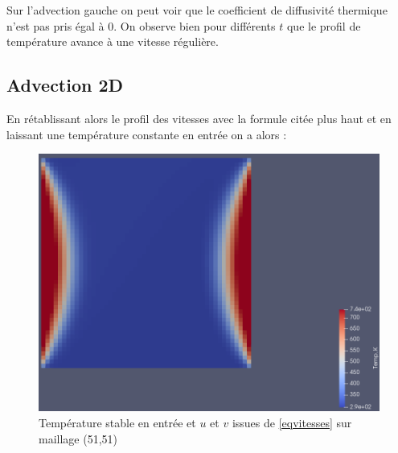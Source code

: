 \documentclass[a4paper,oneside]{article}
\begin{document}
Sur l'advection gauche on peut voir que le coefficient de diffusivité thermique n'est pas pris égal à 0.
On observe bien pour différents $t$ que le profil de température avance à une vitesse régulière.


\clearpage


\subsection{Advection 2D}
En rétablissant alors le profil des vitesses avec la formule citée plus haut et en laissant une température constante en entrée on a alors :

\begin{figure}[h!]
\centering
\includegraphics[scale=0.3]{Advection_2D/TemperatureStableEntree.png}
\caption{Température stable en entrée et $u$ et $v$ issues de \ref{eqvitesses} sur maillage (51,51)}
\end{figure}
\end{document}

